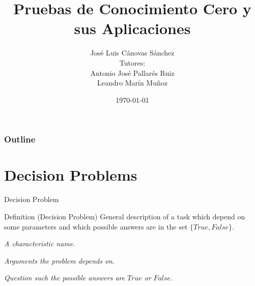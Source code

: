 \documentclass{beamer}
\title{Pruebas de Conocimiento Cero y sus Aplicaciones}
\date{\today}
\author{José Luis Cánovas Sánchez\\[3mm]\scriptsize Tutores:\\Antonio José Pallarés Ruiz\\Leandro Marín Muñoz}
\institute{Universidad de Murcia\\Facultad de Matemáticas}
\begin{document}
\maketitle

\begin{frame}
	\frametitle{Outline}
	\tableofcontents
\end{frame}

\section{Decision Problems}

\begin{frame}{Decision Problem}
	\begin{block}{Definition (Decision Problem)}
		General description of a task which depend on some parameters and which possible answers are in the set $\{True, False \}$.
	\end{block}
	\begin{description}[Parameters]
		\item[Name] \textit{A characteristic name.}
		\item[Parameters] \textit{Arguments the problem depends on}.
		\item[Question] \textit{Question such the possible answers are} $True$ \textit{or} $False$.
	\end{description}
\end{frame}
\end{document}
